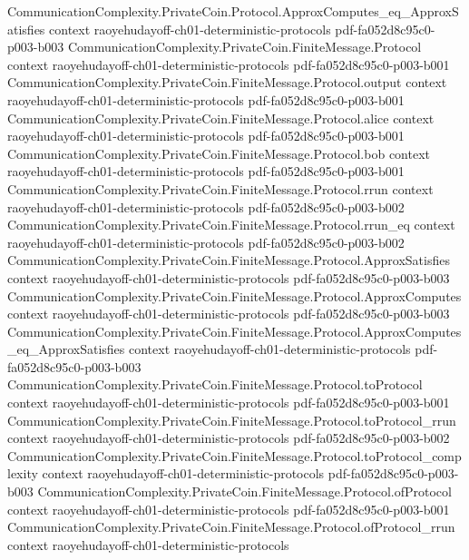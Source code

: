 \begin{theorem}
  {CommunicationComplexity.PrivateCoin.Protocol.ApproxComputes_eq_ApproxSatisfies}
  {context}
  {raoyehudayoff-ch01-deterministic-protocols}
  {pdf-fa052d8c95c0-p003-b003}
\proofstep
  {CommunicationComplexity.PrivateCoin.FiniteMessage.Protocol}
  {context}
  {raoyehudayoff-ch01-deterministic-protocols}
  {pdf-fa052d8c95c0-p003-b001}
\proofstep
  {CommunicationComplexity.PrivateCoin.FiniteMessage.Protocol.output}
  {context}
  {raoyehudayoff-ch01-deterministic-protocols}
  {pdf-fa052d8c95c0-p003-b001}
\proofstep
  {CommunicationComplexity.PrivateCoin.FiniteMessage.Protocol.alice}
  {context}
  {raoyehudayoff-ch01-deterministic-protocols}
  {pdf-fa052d8c95c0-p003-b001}
\proofstep
  {CommunicationComplexity.PrivateCoin.FiniteMessage.Protocol.bob}
  {context}
  {raoyehudayoff-ch01-deterministic-protocols}
  {pdf-fa052d8c95c0-p003-b001}
\proofstep
  {CommunicationComplexity.PrivateCoin.FiniteMessage.Protocol.rrun}
  {context}
  {raoyehudayoff-ch01-deterministic-protocols}
  {pdf-fa052d8c95c0-p003-b002}
\proofstep
  {CommunicationComplexity.PrivateCoin.FiniteMessage.Protocol.rrun_eq}
  {context}
  {raoyehudayoff-ch01-deterministic-protocols}
  {pdf-fa052d8c95c0-p003-b002}
\proofstep
  {CommunicationComplexity.PrivateCoin.FiniteMessage.Protocol.ApproxSatisfies}
  {context}
  {raoyehudayoff-ch01-deterministic-protocols}
  {pdf-fa052d8c95c0-p003-b003}
\proofstep
  {CommunicationComplexity.PrivateCoin.FiniteMessage.Protocol.ApproxComputes}
  {context}
  {raoyehudayoff-ch01-deterministic-protocols}
  {pdf-fa052d8c95c0-p003-b003}
\proofstep
  {CommunicationComplexity.PrivateCoin.FiniteMessage.Protocol.ApproxComputes_eq_ApproxSatisfies}
  {context}
  {raoyehudayoff-ch01-deterministic-protocols}
  {pdf-fa052d8c95c0-p003-b003}
\proofstep
  {CommunicationComplexity.PrivateCoin.FiniteMessage.Protocol.toProtocol}
  {context}
  {raoyehudayoff-ch01-deterministic-protocols}
  {pdf-fa052d8c95c0-p003-b001}
\proofstep
  {CommunicationComplexity.PrivateCoin.FiniteMessage.Protocol.toProtocol_rrun}
  {context}
  {raoyehudayoff-ch01-deterministic-protocols}
  {pdf-fa052d8c95c0-p003-b002}
\proofstep
  {CommunicationComplexity.PrivateCoin.FiniteMessage.Protocol.toProtocol_complexity}
  {context}
  {raoyehudayoff-ch01-deterministic-protocols}
  {pdf-fa052d8c95c0-p003-b003}
\proofstep
  {CommunicationComplexity.PrivateCoin.FiniteMessage.Protocol.ofProtocol}
  {context}
  {raoyehudayoff-ch01-deterministic-protocols}
  {pdf-fa052d8c95c0-p003-b001}
\proofstep
  {CommunicationComplexity.PrivateCoin.FiniteMessage.Protocol.ofProtocol_rrun}
  {context}
  {raoyehudayoff-ch01-deterministic-protocols}

\end{theorem}
